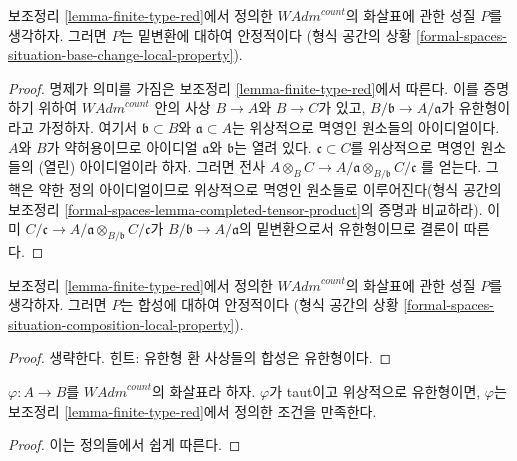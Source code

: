 \begin{lemma}
\label{lemma-base-change-finite-type-red}
보조정리 \ref{lemma-finite-type-red}에서 정의한
$\textit{WAdm}^{count}$의 화살표에 관한 성질 $P$를 생각하자.
그러면 $P$는 밑변환에 대하여 안정적이다
(형식 공간의 상황 \ref{formal-spaces-situation-base-change-local-property}).
\end{lemma}

\begin{proof}
명제가 의미를 가짐은 보조정리 \ref{lemma-finite-type-red}에서 따른다.
이를 증명하기 위하여 $\textit{WAdm}^{count}$ 안의 사상
$B \to A$와 $B \to C$가 있고,
$B/\mathfrak b \to A/\mathfrak a$가 유한형이라고 가정하자.
여기서 $\mathfrak b \subset B$와 $\mathfrak a \subset A$는
위상적으로 멱영인 원소들의 아이디얼이다.
$A$와 $B$가 약허용이므로 아이디얼 $\mathfrak a$와 $\mathfrak b$는 열려 있다.
$\mathfrak c \subset C$를 위상적으로 멱영인 원소들의 (열린) 아이디얼이라 하자.
그러면 전사
$
A \widehat{\otimes}_B C \to
A/\mathfrak a \otimes_{B/\mathfrak b} C/\mathfrak c
$
를 얻는다. 그 핵은 약한 정의 아이디얼이므로 위상적으로 멱영인 원소들로
이루어진다(형식 공간의 보조정리
\ref{formal-spaces-lemma-completed-tensor-product}의 증명과 비교하라).
이미 $C/\mathfrak c \to A/\mathfrak a \otimes_{B/\mathfrak b} C/\mathfrak c$가
$B/\mathfrak b \to A/\mathfrak a$의 밑변환으로서 유한형이므로 결론이 따른다.
\end{proof}

\begin{lemma}
\label{lemma-composition-finite-type-red}
보조정리 \ref{lemma-finite-type-red}에서 정의한
$\textit{WAdm}^{count}$의 화살표에 관한 성질 $P$를 생각하자.
그러면 $P$는 합성에 대하여 안정적이다
(형식 공간의 상황 \ref{formal-spaces-situation-composition-local-property}).
\end{lemma}

\begin{proof}
생략한다. 힌트: 유한형 환 사상들의 합성은 유한형이다.
\end{proof}

\begin{lemma}
\label{lemma-finite-type-finite-type-red}
$\varphi : A \to B$를 $\textit{WAdm}^{count}$의 화살표라 하자.
$\varphi$가 taut이고 위상적으로 유한형이면, $\varphi$는 보조정리
\ref{lemma-finite-type-red}에서 정의한 조건을 만족한다.
\end{lemma}

\begin{proof}
이는 정의들에서 쉽게 따른다.
\end{proof}


